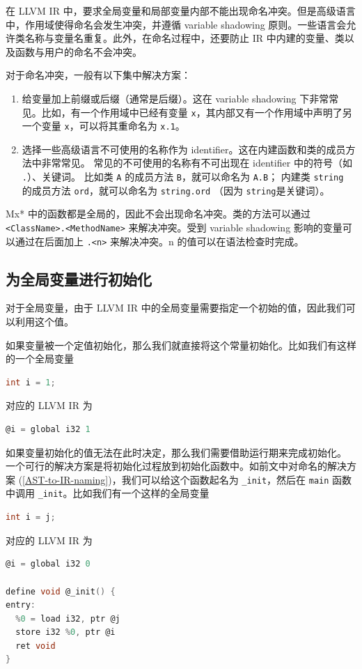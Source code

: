 在 LLVM IR 中，要求全局变量和局部变量内部不能出现命名冲突。但是高级语言中，作用域使得命名会发生冲突，并遵循
variable shadowing 原则。一些语言会允许类名称与变量名重复。此外，在命名过程中，还要防止
IR 中内建的变量、类以及函数与用户的命名不会冲突。

对于命名冲突，一般有以下集中解决方案：
\begin{enumerate}
 \item 给变量加上前缀或后缀（通常是后缀）。这在 variable shadowing 下非常常见。比如，有一个作用域中已经有变量
   \texttt x，其内部又有一个作用域中声明了另一个变量 \texttt x，可以将其重命名为
   \texttt{x.1}。
 \item 选择一些高级语言不可使用的名称作为 identifier。这在内建函数和类的成员方法中非常常见。
   常见的不可使用的名称有不可出现在 identifier 中的符号（如 \texttt{.}）、关键词。
   比如类 \texttt A 的成员方法 \texttt{B}，就可以命名为 \texttt{A.B}；
   内建类 \texttt{string} 的成员方法 \texttt{ord}，就可以命名为 \texttt{string.ord}
   （因为 \texttt{string}是关键词）。
\end{enumerate}

Mx* 中的函数都是全局的，因此不会出现命名冲突。类的方法可以通过
\texttt{<ClassName>.<MethodName>} 来解决冲突。受到 variable shadowing
影响的变量可以通过在后面加上 \texttt{.<n>} 来解决冲突。n 的值可以在语法检查时完成。

\subsection{为全局变量进行初始化}\label{AST-to-IR-initializing}

对于全局变量，由于 LLVM IR 中的全局变量需要指定一个初始的值，因此我们可以利用这个值。

如果变量被一个定值初始化，那么我们就直接将这个常量初始化。比如我们有这样的一个全局变量
\begin{lstlisting}[language=C]
int i = 1;
\end{lstlisting}
对应的 LLVM IR 为
\begin{lstlisting}[language=C]
@i = global i32 1
\end{lstlisting}

如果变量初始化的值无法在此时决定，那么我们需要借助运行期来完成初始化。
一个可行的解决方案是将初始化过程放到初始化函数中。如前文中对命名的解决方案
(\ref{AST-to-IR-naming})，我们可以给这个函数起名为 \texttt{\_init}，然后在
\texttt{main} 函数中调用 \texttt{\_init}。比如我们有一个这样的全局变量
\begin{lstlisting}[language=C]
int i = j;
\end{lstlisting}
对应的 LLVM IR 为
\begin{lstlisting}[language=C]
@i = global i32 0

define void @_init() {
entry:
  %0 = load i32, ptr @j
  store i32 %0, ptr @i
  ret void
}
\end{lstlisting}

